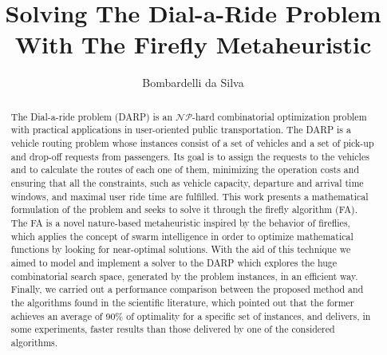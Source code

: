 \documentclass[tuberlin,cic,tc,openright,english,noabntcite,oneside]{iiufrgs}
\title{Solving The Dial-a-Ride Problem With The Firefly Metaheuristic}
\author{Bombardelli da Silva}{Fernando}
\begin{document}
\maketitle





\begin{abstract}
The Dial-a-ride problem (DARP) is an $\mathcal{NP}$-hard combinatorial optimization problem with practical applications in user-oriented public transportation. The DARP is a vehicle routing problem whose instances consist of a set of vehicles and a set of pick-up and drop-off requests from passengers. Its goal is to assign the requests to the vehicles and to calculate the routes of each one of them, minimizing the operation costs and ensuring that all the constraints, such as vehicle capacity, departure and arrival time windows, and maximal user ride time are fulfilled. This work presents a mathematical formulation of the problem and seeks to solve it through the firefly algorithm (FA). The FA is a novel nature-based metaheuristic inspired by the behavior of fireflies, which applies the concept of swarm intelligence in order to optimize mathematical functions by looking for near-optimal solutions. With the aid of this technique we aimed to model and implement a solver to the DARP which explores the huge combinatorial search space, generated by the problem instances, in an efficient way. Finally, we carried out a performance comparison between the proposed method and the algorithms found in the scientific literature, which pointed out that the former achieves an average of 90\% of optimality for a specific set of instances, and delivers, in some experiments, faster results than those delivered by one of the considered algorithms.
\end{abstract}
\end{document}
